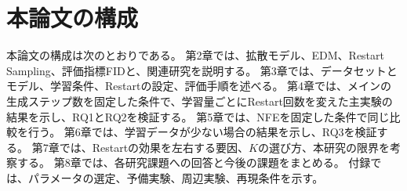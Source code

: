 \section{本論文の構成}
\label{sec:intro-organization}

本論文の構成は次のとおりである。
第2章では、拡散モデル、EDM、Restart Sampling、評価指標FIDと、関連研究を説明する。
第3章では、データセットとモデル、学習条件、Restartの設定、評価手順を述べる。
第4章では、メインの生成ステップ数を固定した条件で、学習量ごとにRestart回数を変えた主実験の結果を示し、RQ1とRQ2を検証する。
第5章では、NFEを固定した条件で同じ比較を行う。
第6章では、学習データが少ない場合の結果を示し、RQ3を検証する。
第7章では、Restartの効果を左右する要因、$K$の選び方、本研究の限界を考察する。
第8章では、各研究課題への回答と今後の課題をまとめる。
付録では、パラメータの選定、予備実験、周辺実験、再現条件を示す。
